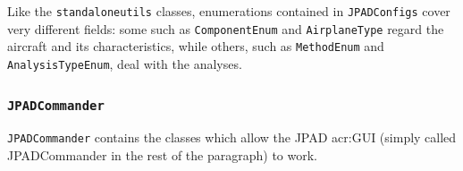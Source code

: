 \bigskip
\noindent
Like the \lstinline[language=Java]!standaloneutils! classes, enumerations contained in \lstinline[language=Java]!JPADConfigs! cover very different fields: some such as \lstinline[language=Java]!ComponentEnum! and \lstinline[language=Java]!AirplaneType! regard the aircraft and its characteristics, while others, such as \lstinline[language=Java]!MethodEnum! and \lstinline[language=Java]!AnalysisTypeEnum!, deal with the analyses.

\subsubsection{\texttt{JPADCommander}}
\lstinline[language=Java]!JPADCommander! contains the classes which allow the \gls{JPAD} \gls{acr:GUI} (simply called JPADCommander in the rest of the paragraph) to work. 

